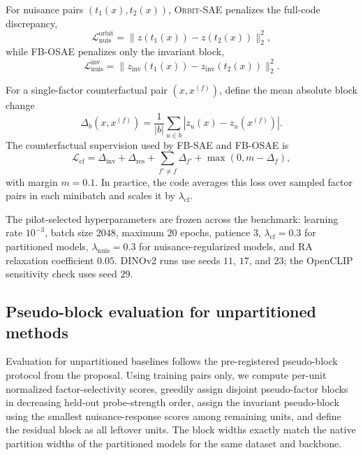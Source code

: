 \documentclass[10pt,twocolumn]{article}
\newcommand{\method}[1]{\textsc{#1}}
\begin{document}
For nuisance pairs $(t_1(x), t_2(x))$, \method{Orbit-SAE} penalizes the full-code discrepancy,
\begin{equation}
\mathcal{L}_{\mathrm{nuis}}^{\mathrm{orbit}} = \| z(t_1(x)) - z(t_2(x)) \|_2^2,
\end{equation}
while \method{FB-OSAE} penalizes only the invariant block,
\begin{equation}
\mathcal{L}_{\mathrm{nuis}}^{\mathrm{inv}} = \| z_{\mathrm{inv}}(t_1(x)) - z_{\mathrm{inv}}(t_2(x)) \|_2^2.
\end{equation}

For a single-factor counterfactual pair $(x, x^{(f)})$, define the mean absolute block change
\begin{equation}
\Delta_b(x, x^{(f)}) = \frac{1}{|b|} \sum_{u \in b} | z_u(x) - z_u(x^{(f)}) |.
\end{equation}
The counterfactual supervision used by \method{FB-SAE} and \method{FB-OSAE} is
\begin{equation}
\mathcal{L}_{\mathrm{cf}} =
\Delta_{\mathrm{inv}} + \Delta_{\mathrm{res}} + \sum_{f' \neq f} \Delta_{f'} + \max(0, m - \Delta_f),
\end{equation}
with margin $m = 0.1$. In practice, the code averages this loss over sampled factor pairs in each minibatch and scales it by $\lambda_{\mathrm{cf}}$.

The pilot-selected hyperparameters are frozen across the benchmark: learning rate $10^{-3}$, batch size $2048$, maximum $20$ epochs, patience $3$, $\lambda_{\mathrm{cf}} = 0.3$ for partitioned models, $\lambda_{\mathrm{nuis}} = 0.3$ for nuisance-regularized models, and RA relaxation coefficient $0.05$. DINOv2 runs use seeds $11$, $17$, and $23$; the OpenCLIP sensitivity check uses seed $29$.

\subsection{Pseudo-block evaluation for unpartitioned methods}
Evaluation for unpartitioned baselines follows the pre-registered pseudo-block protocol from the proposal. Using training pairs only, we compute per-unit normalized factor-selectivity scores, greedily assign disjoint pseudo-factor blocks in decreasing held-out probe-strength order, assign the invariant pseudo-block using the smallest nuisance-response scores among remaining units, and define the residual block as all leftover units. The block widths exactly match the native partition widths of the partitioned models for the same dataset and backbone.
\end{document}
